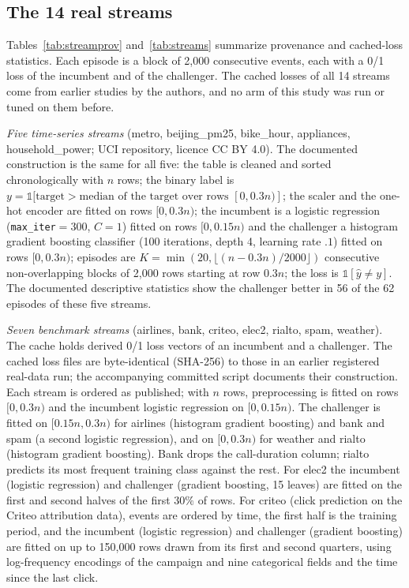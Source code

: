 \documentclass[10pt]{article}
\theoremstyle{plain}
\theoremstyle{definition}
\newcommand{\one}{\mathds{1}}
\begin{document}
{\scriptsize

}

\subsection{The 14 real streams}
Tables~\ref{tab:streamprov} and~\ref{tab:streams} summarize provenance and cached-loss statistics. Each episode is a block of 2{,}000 consecutive events, each with a 0/1 loss of the incumbent and of the challenger. The cached losses of all 14 streams come from earlier studies by the authors, and no arm of this study was run or tuned on them before.

\emph{Five time-series streams} (metro, beijing\_pm25, bike\_hour, appliances, household\_power; UCI repository, licence CC BY 4.0). The documented construction is the same for all five: the table is cleaned and sorted chronologically with $n$ rows; the binary label is $y=\one[\text{target}>\text{median of the target over rows }[0,0.3n)]$; the scaler and the one-hot encoder are fitted on rows $[0,0.3n)$; the incumbent is a logistic regression (\texttt{max\_iter}$=300$, $C=1$) fitted on rows $[0,0.15n)$ and the challenger a histogram gradient boosting classifier (100 iterations, depth 4, learning rate $.1$) fitted on rows $[0,0.3n)$; episodes are $K=\min(20,\lfloor(n-0.3n)/2000\rfloor)$ consecutive non-overlapping blocks of 2{,}000 rows starting at row $0.3n$; the loss is $\one[\hat y\ne y]$. The documented descriptive statistics show the challenger better in 56 of the 62 episodes of these five streams.

\emph{Seven benchmark streams} (airlines, bank, criteo, elec2, rialto, spam, weather). The cache holds derived 0/1 loss vectors of an incumbent and a challenger. The cached loss files are byte-identical (SHA-256) to those in an earlier registered real-data run; the accompanying committed script documents their construction. Each stream is ordered as published; with $n$ rows, preprocessing is fitted on rows $[0,0.3n)$ and the incumbent logistic regression on $[0,0.15n)$. The challenger is fitted on $[0.15n,0.3n)$ for airlines (histogram gradient boosting) and bank and spam (a second logistic regression), and on $[0,0.3n)$ for weather and rialto (histogram gradient boosting). Bank drops the call-duration column; rialto predicts its most frequent training class against the rest. For elec2 the incumbent (logistic regression) and challenger (gradient boosting, 15 leaves) are fitted on the first and second halves of the first $30\%$ of rows. For criteo (click prediction on the Criteo attribution data), events are ordered by time, the first half is the training period, and the incumbent (logistic regression) and challenger (gradient boosting) are fitted on up to 150{,}000 rows drawn from its first and second quarters, using log-frequency encodings of the campaign and nine categorical fields and the time since the last click.
\end{document}
